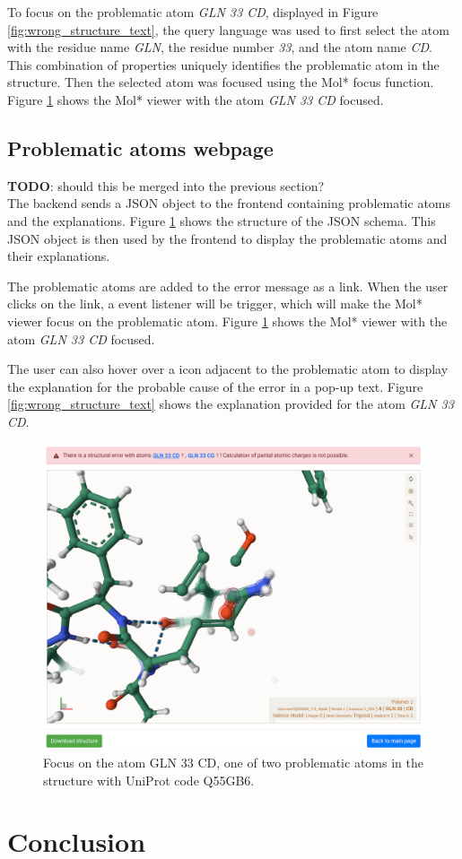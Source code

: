 \documentclass[
  digital,     %
  oneside,     %
  nosansbold,  %
  nocolorbold, %
  lof,         %
  lot,         %
]{fithesis4}
\begin{document}
To focus on the problematic atom \textit{GLN 33 CD}, displayed in Figure \ref{fig:wrong_structure_text}, the query language was used to first select the atom with the residue name \textit{GLN}, the residue number \textit{33}, and the atom name \textit{CD}. This combination of properties uniquely identifies the problematic atom in the structure. Then the selected atom was focused using the Mol* focus function. Figure \ref{fig:wrong_structure_focus} shows the Mol* viewer with the atom \textit{GLN 33 CD} focused.


\section{Problematic atoms webpage}

\textbf{TODO}: should this be merged into the previous section? \\ 

The backend sends a JSON object to the frontend containing problematic atoms and the explanations. Figure \ref{} shows the structure of the JSON schema. This JSON object is then used by the frontend to display the problematic atoms and their explanations.

The problematic atoms are added to the error message as a link. When the user clicks on the link, a event listener will be trigger, which will make the Mol* viewer focus on the problematic atom. Figure \ref{fig:wrong_structure_focus} shows the Mol* viewer with the atom \textit{GLN 33 CD} focused.

The user can also hover over a icon adjacent to the problematic atom to display the explanation for the probable cause of the error in a pop-up text. Figure \ref{fig:wrong_structure_text} shows the explanation provided for the atom \textit{GLN 33 CD}.

\begin{figure}[htbp]
  \begin{center}
    \includegraphics[width=\textwidth]{figures/wrong_structure_focus.png}
  \end{center}
  \caption{Focus on the atom GLN 33 CD, one of two problematic atoms in the structure with UniProt code Q55GB6.}
  \label{fig:wrong_structure_focus}
\end{figure}

\chapter*{Conclusion}

\printbibliography[heading=bibintoc]
\end{document}

